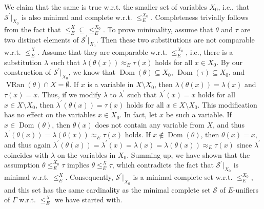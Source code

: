  
 
We claim that the same is true w.r.t. the smaller set of variables $X_{0}$, i.e., that $\mathcal{S}^{\prime}|_{X_{0}}$ is also minimal and complete w.r.t. $\leq_{E}^{X_{0}}$. Completeness trivially follows from the fact that ${\leq_{E}^{X}}\subseteq{\leq_{E}^{X_{0}}}$. To prove minimality, assume that $\theta$ and $\tau$ are two distinct elements of $\mathcal{S}^{\prime}|_{X_{0}}$. Then these two substitutions are not comparable w.r.t. $\leq_{E}^{X}$. Assume that they are comparable w.r.t. $\leq_{E}^{X_{0}}$, i.e., there is a substitution $\lambda$ such that $\lambda(\theta(x))\approx_{E}\tau(x)$ holds for all $x\in X_{0}$. By our construction of $\mathcal{S}^{\prime}|_{X_{0}}$, we know that $\operatorname{Dom}(\theta)\subseteq X_{0}$, $\operatorname{Dom}(\tau)\subseteq X_{0}$, and $\operatorname{VRan}(\theta)\cap X=\emptyset$. If $x$ is a variable in $X\setminus X_{0}$, then $\lambda(\theta(x))=\lambda(x)$ and $\tau(x)=x$. Thus, if we modify $\lambda$ to $\lambda^{\prime}$ such that $\lambda^{\prime}(x)=x$ holds for all $x\in X\setminus X_{0}$, then $\lambda^{\prime}(\theta(x))=\tau(x)$ holds for all $x\in X\setminus X_{0}$. This modification has no effect on the variables $x\in X_{0}$. In fact, let $x$ be such a variable. If $x\in\operatorname{Dom}(\theta)$, then $\theta(x)$ does not contain any variable from $X$, and thus $\lambda^{\prime}(\theta(x))=\lambda(\theta(x))\approx_{E}\tau(x)$ holds. If $x\notin\operatorname{Dom}(\theta)$, then $\theta(x)=x$, and thus again $\lambda^{\prime}(\theta(x))=\lambda^{\prime}(x)=\lambda(x)=\lambda(\theta(x))%
\approx_{E}\tau(x)$ since $\lambda^{\prime}$ coincides with $\lambda$ on the variables in $X_{0}$. Summing up, we have shown that the assumption $\theta\leq_{E}^{X_{0}}\tau$ implies $\theta\leq_{E}^{X}\tau$, which contradicts the fact that $\mathcal{S}^{\prime}|_{X_{0}}$ is minimal w.r.t. $\leq_{E}^{X}$. Consequently, $\mathcal{S}^{\prime}|_{X_{0}}$ is a minimal complete set w.r.t. $\leq_{E}^{X_{0}}$, and this set has the same cardinality as the minimal complete set $\mathcal{S}$ of $E$-unifiers of $\Gamma$ w.r.t. $\leq_{E}^{X}$ we have started with.\par
 
 
 
